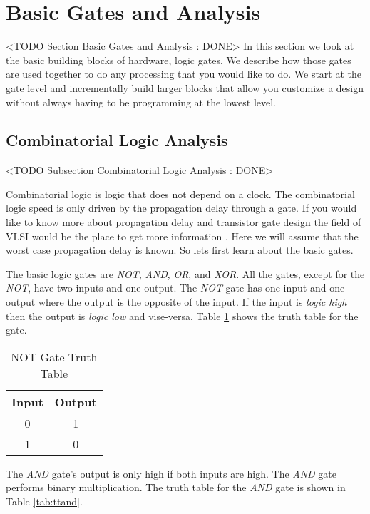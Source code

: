 \section{Basic Gates and Analysis}
	<TODO Section Basic Gates and Analysis : DONE>
In this section we look at the basic building blocks of hardware, logic gates. We describe how those gates are used together to do any processing that you would like to do. We start at the gate level and incrementally build larger blocks that allow you customize a design without always having to be programming at the lowest level.

\subsection{Combinatorial Logic Analysis}
	<TODO Subsection Combinatorial Logic Analysis : DONE>

Combinatorial logic is logic that does not depend on a clock. The combinatorial logic speed is only driven by the propagation delay through a gate. If you would like to know more about propagation delay and transistor gate design the field of \ac{VLSI} would be the place to get more information \cite{vlsiref}. Here we will assume that the worst case propagation delay is known. So lets first learn about the basic gates.
	
The basic logic gates are \emph{NOT}, \emph{AND}, \emph{OR}, and \emph{XOR}. All the gates, except for the \emph{NOT}, have two inputs and one output. The \emph{NOT} gate has one input and one output where the output is the opposite of the input. If the input is \emph{logic high} then the output is \emph{logic low} and vise-versa. Table \ref{tab:ttnot} shows the truth table for the gate.
	
\begin{table}[h!]  
\begin{center}    
\caption{NOT Gate Truth Table} 
\label{tab:ttnot} 
\begin{tabular}{|c|c|}  
\textbf{Input} & \textbf{Output}\\  
\hline  
0 & 1\\  
1 & 0\\ 
\end{tabular}  
\end{center}
\end{table}

The \emph{AND} gate's output is only high if both inputs are high. The \emph{AND} gate performs binary multiplication. The truth table for the \emph{AND} gate is shown in Table \ref{tab:ttand}.

